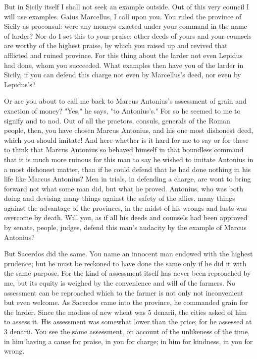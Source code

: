  But in Sicily itself I shall not seek an example outside. Out of this very council I will use examples. Gaius Marcellus, I call upon you. You ruled the province of Sicily as proconsul: were any moneys exacted under your command in the name of larder? Nor do I set this to your praise: other deeds of yours and your counsels are worthy of the highest praise, by which you raised up and revived that afflicted and ruined province. For this thing about the larder not even Lepidus had done, whom you succeeded. What examples then have you of the larder in Sicily, if you can defend this charge not even by Marcellus's deed, nor even by Lepidus's?

 Or are you about to call me back to Marcus Antonius's assessment of grain and exaction of money? "Yes," he says, "to Antonius's." For so he seemed to me to signify and to nod. Out of all the praetors, consuls, generals of the Roman people, then, you have chosen Marcus Antonius, and his one most dishonest deed, which you should imitate! And here whether is it hard for me to say or for these to think that Marcus Antonius so behaved himself in that boundless command that it is much more ruinous for this man to say he wished to imitate Antonius in a most dishonest matter, than if he could defend that he had done nothing in his life like Marcus Antonius? Men in trials, in defending a charge, are wont to bring forward not what some man did, but what he proved. Antonius, who was both doing and devising many things against the safety of the allies, many things against the advantage of the provinces, in the midst of his wrongs and lusts was overcome by death. Will you, as if all his deeds and counsels had been approved by senate, people, judges, defend this man's audacity by the example of Marcus Antonius?

 But Sacerdos did the same. You name an innocent man endowed with the highest prudence; but he must be reckoned to have done the same only if he did it with the same purpose. For the kind of assessment itself has never been reproached by me, but its equity is weighed by the convenience and will of the farmers. No assessment can be reproached which to the farmer is not only not inconvenient but even welcome. As Sacerdos came into the province, he commanded grain for the larder. Since the modius of new wheat was 5 denarii, the cities asked of him to assess it. His assessment was somewhat lower than the price; for he assessed at 3 denarii. You see the same assessment, on account of the unlikeness of the time, in him having a cause for praise, in you for charge; in him for kindness, in you for wrong.

